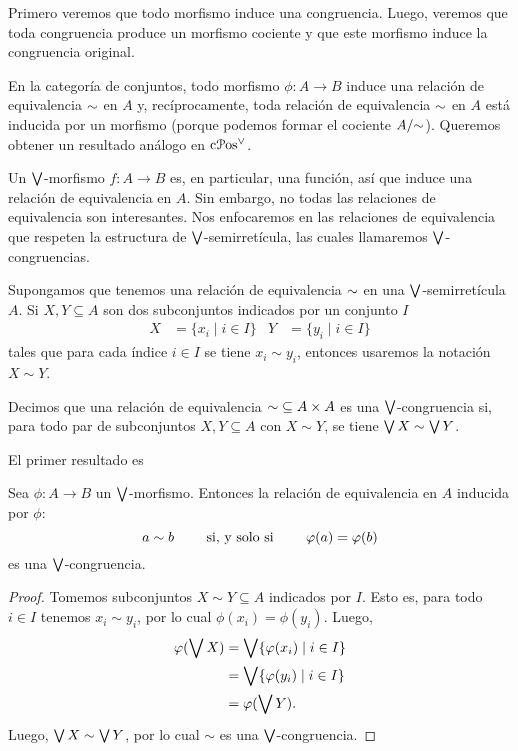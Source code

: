 Primero veremos que todo morfismo induce una congruencia.
Luego, veremos que toda congruencia produce un morfismo cociente y
que este morfismo induce la congruencia original.

En la categoría de conjuntos, todo morfismo $\phi:A\to B$
induce una relación de equivalencia ${\sim}$ en $A$  y,
recíprocamente, toda relación de equivalencia ${\sim}$ en $A$ está
inducida por un morfismo (porque podemos formar el cociente
$A/{\sim}$).
Queremos obtener un resultado análogo en $\mathrm{c}\mathcal{P}\mathrm{os}^\vee$.

Un $\bigvee$-morfismo $f:A\to B$ es, en particular,
una función, así que induce una relación de equivalencia en $A$.
Sin embargo, no todas las relaciones de equivalencia son
interesantes. Nos enfocaremos en las relaciones de equivalencia
que respeten la estructura de $\bigvee$-semirretícula, las cuales
llamaremos $\bigvee$-congruencias.

Supongamos que tenemos una relación de equivalencia
${\sim}$ en una $\bigvee$-semirre\-tícula $A$.
Si $X,Y\subseteq A$ son dos subconjuntos 
indicados por un conjunto $I$
\begin{align*}
    X &= \{x_i \mid i\in I\} &
    Y &= \{y_i \mid i\in I\}
\end{align*}
tales que para cada índice $i\in I$ se tiene $x_i\sim y_i$,
entonces usaremos la notación $X\sim Y$.

Decimos que una relación de equivalencia ${\sim}\subseteq A\times
A$ es una $\bigvee$-congruencia si, para todo par de subconjuntos
$X,Y\subseteq A$ con $X\sim Y$, se tiene $\bigvee X\sim \bigvee Y$.

El primer resultado es
\begin{lemma}
  Sea $\phi:A\to B$ un $\bigvee$-morfismo.
  Entonces la relación de equivalencia en $A$ inducida por
  $\phi$:
  \[
      a\sim b \qquad\text{ si, y solo si }\qquad \varphi(a) = \varphi(b)
  \]
  es una $\bigvee$-congruencia.
\end{lemma}
\begin{proof}
  Tomemos subconjuntos $X\sim Y\subseteq A$ indicados por $I$.
  Esto es, para todo $i\in I$ tenemos $x_i\sim y_i$,
  por lo cual $\phi(x_i)=\phi(y_i)$.
  Luego,
  \begin{align*}
      \varphi(\bigvee X)
      &= \bigvee\{\varphi(x_i)\mid i\in I\} \\
      &= \bigvee\{\varphi(y_i)\mid i\in I\} \\
      &= \varphi(\bigvee Y).
  \end{align*}
  Luego, $\bigvee X \sim \bigvee Y$, por lo cual $\sim$ es una
  $\bigvee$-congruencia.
\end{proof}

